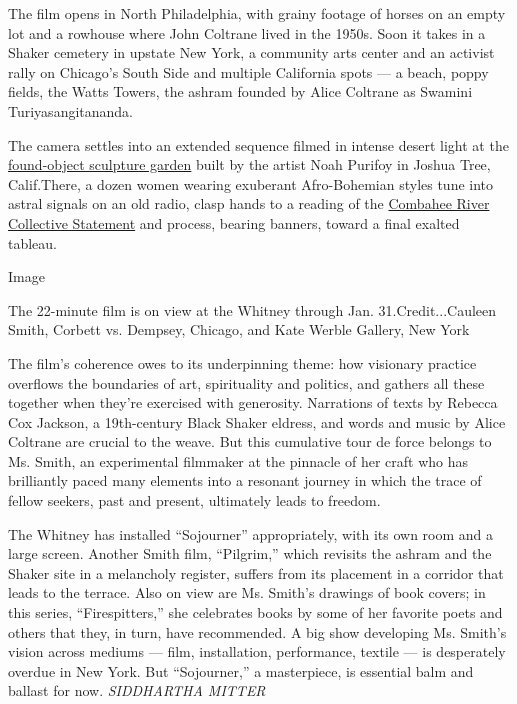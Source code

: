 The film opens in North Philadelphia, with grainy footage of horses on
an empty lot and a rowhouse where John Coltrane lived in the 1950s. Soon
it takes in a Shaker cemetery in upstate New York, a community arts
center and an activist rally on Chicago's South Side and multiple
California spots --- a beach, poppy fields, the Watts Towers, the ashram
founded by Alice Coltrane as Swamini Turiyasangitananda.

The camera settles into an extended sequence filmed in intense desert
light at the
\href{http://www.noahpurifoy.com/joshua-tree-outdoor-museum}{found-object
sculpture garden} built by the artist Noah Purifoy in Joshua Tree,
Calif.There, a dozen women wearing exuberant Afro-Bohemian styles tune
into astral signals on an old radio, clasp hands to a reading of the
\href{https://www.newyorker.com/news/our-columnists/until-black-women-are-free-none-of-us-will-be-free}{Combahee
River Collective Statement} and process, bearing banners, toward a final
exalted tableau.

Image

The 22-minute film is on view at the Whitney through Jan.
31.Credit...Cauleen Smith, Corbett vs. Dempsey, Chicago, and Kate Werble
Gallery, New York

The film's coherence owes to its underpinning theme: how visionary
practice overflows the boundaries of art, spirituality and politics, and
gathers all these together when they're exercised with generosity.
Narrations of texts by Rebecca Cox Jackson, a 19th-century Black Shaker
eldress, and words and music by Alice Coltrane are crucial to the weave.
But this cumulative tour de force belongs to Ms. Smith, an experimental
filmmaker at the pinnacle of her craft who has brilliantly paced many
elements into a resonant journey in which the trace of fellow seekers,
past and present, ultimately leads to freedom.

The Whitney has installed ``Sojourner'' appropriately, with its own room
and a large screen. Another Smith film, ``Pilgrim,'' which revisits the
ashram and the Shaker site in a melancholy register, suffers from its
placement in a corridor that leads to the terrace. Also on view are Ms.
Smith's drawings of book covers; in this series, ``Firespitters,'' she
celebrates books by some of her favorite poets and others that they, in
turn, have recommended. A big show developing Ms. Smith's vision across
mediums --- film, installation, performance, textile --- is desperately
overdue in New York. But ``Sojourner,'' a masterpiece, is essential balm
and ballast for now. \emph{SIDDHARTHA MITTER}

